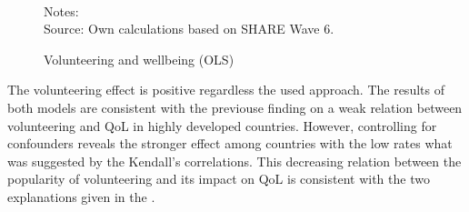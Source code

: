 \documentclass[10pt, letterpaper]{article}
\begin{document}
\begin{spacing}{1.4}
\begin{figure}[H]
\centering
\caption{Volunteering and wellbeing (OLS)} 
\label{fig:casp_ols}
\begin{minipage}{1\linewidth}
\quad
{}~\\ 
{\footnotesize Notes: }~\\
{\footnotesize Source: Own calculations based on SHARE Wave 6.}
\end{minipage}
\end{figure} 

The volunteering effect is positive regardless the used approach. The results of both models are consistent with the previouse finding on a weak relation between volunteering and QoL in highly developed countries. However, controlling for confounders reveals the stronger effect among countries with the low rates what was suggested by the Kendall's correlations. This decreasing relation between the popularity of volunteering and its impact on QoL is consistent with the two explanations given in the \citet{haski09}.     \\


\end{spacing}
\end{document}

